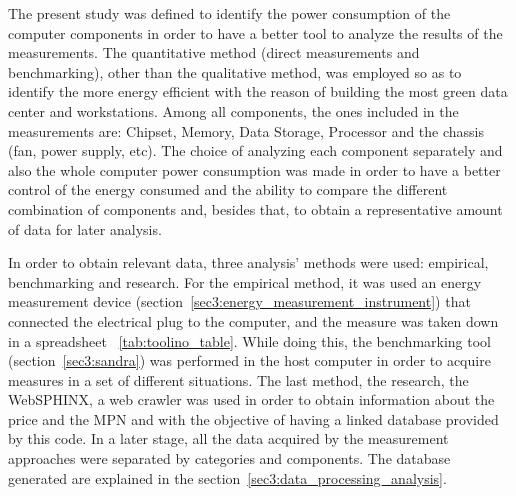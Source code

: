
    The present study was defined to identify the power consumption of the computer components in order to have a better tool to analyze the results of the measurements. The quantitative method (direct measurements and benchmarking), other than the qualitative method, was employed so as to identify the more energy efficient with the reason of building the most green data center and workstations. Among all components, the ones included in the measurements are: Chipset, Memory, Data Storage, Processor and the chassis (fan, power supply, etc).
    The choice of analyzing each component separately and also the whole computer power consumption was made in order to have a better control of the energy consumed and the ability to compare the different combination of components and, besides that, to obtain a representative amount of data for later analysis.

    In order to obtain relevant data, three analysis' methods were used: empirical, benchmarking and research. For the empirical method, it was used an energy measurement device (section~\ref{sec3:energy_measurement_instrument}) that connected the electrical plug to the computer, and the measure was taken down in a spreadsheet%
~\ref{tab:toolino_table}. While doing this, the benchmarking tool (section~\ref{sec3:sandra}) was performed in the host computer in order to acquire measures in a set of different situations. The last method, the research, the WebSPHINX, a web crawler was used in order to obtain information about the price and the MPN and with the objective of having a linked database provided by this code.
    In a later stage, all the data acquired by the measurement approaches were separated by categories and components. The database generated are explained in the section~\ref{sec3:data_processing_analysis}.
    
